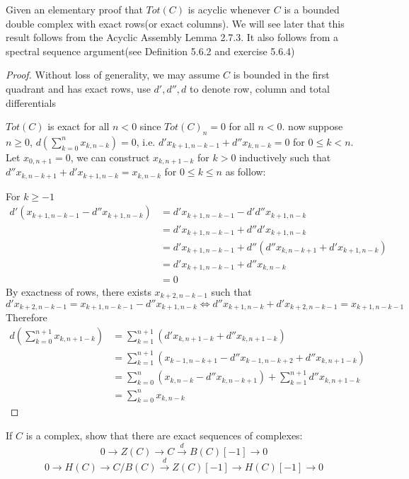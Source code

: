 \documentclass{article}
\newenvironment{exercise}[2][Exercise]{\begin{trivlist}
\item[\hskip \labelsep {\bfseries #1}\hskip \labelsep {\bfseries #2.}]}{\end{trivlist}}
\theoremstyle{definition}
\theoremstyle{remark}
\theoremstyle{definition}
\begin{document}
\begin{exercise}{\textbf{1.2.5}}
Given an elementary proof that $Tot(C)$ is acyclic whenever $C$ is a bounded double complex with exact rows(or exact columns). We will see later that this result follows from the Acyclic Assembly Lemma 2.7.3. It also follows from a spectral sequence argument(see Definition 5.6.2 and exercise 5.6.4)
\end{exercise}

\begin{proof}
Without loss of generality, we may assume $C$ is bounded in the first quadrant and has exact rows, use $d',d'',d$ to denote row, column and total differentials \par
$Tot(C)$ is exact for all $n<0$ since $Tot(C)_n=0$ for all $n<0$. now suppose $n\geq 0$, $\displaystyle d\left(\sum_{k=0}^n x_{k,n-k}\right)=0$, i.e. $d'x_{k+1,n-k-1}+d''x_{k,n-k}=0$ for $0\leq k<n$. Let $x_{0,n+1}=0$, we can construct $x_{k,n+1-k}$ for $k>0$ inductively such that $d''x_{k,n-k+1}+d'x_{k+1,n-k}=x_{k,n-k}$ for $0\leq k\leq n$ as follow: \par
For $k\geq -1$
\begin{align*}
d'(x_{k+1,n-k-1}-d''x_{k+1,n-k})&=d'x_{k+1,n-k-1}-d'd''x_{k+1,n-k} \\
&=d'x_{k+1,n-k-1}+d''d'x_{k+1,n-k} \\
&=d'x_{k+1,n-k-1}+d''(d''x_{k,n-k+1}+d'x_{k+1,n-k}) \\
&=d'x_{k+1,n-k-1}+d''x_{k,n-k} \\
&=0
\end{align*}
By exactness of rows, there exists $x_{k+2,n-k-1}$ such that
\[d'x_{k+2,n-k-1}=x_{k+1,n-k-1}-d''x_{k+1,n-k}\Leftrightarrow d''x_{k+1,n-k}+d'x_{k+2,n-k-1}=x_{k+1,n-k-1}\]
Therefore
\begin{align*}
d\left(\sum_{k=0}^{n+1} x_{k,n+1-k}\right)&=\sum_{k=1}^{n+1} (d'x_{k,n+1-k}+d''x_{k,n+1-k}) \\
&=\sum_{k=1}^{n+1} (x_{k-1,n-k+1}-d''x_{k-1,n-k+2}+d''x_{k,n+1-k}) \\
&=\sum_{k=0}^{n} (x_{k,n-k}-d''x_{k,n-k+1})+\sum_{k=1}^{n+1}d''x_{k,n+1-k} \\
&=\sum_{k=0}^{n} x_{k,n-k}
\end{align*}
\end{proof}

\begin{exercise}{\textbf{1.2.7}}
If $C$ is a complex, show that there are exact sequences of complexes:
\[0\to Z(C)\to C\xrightarrow{d}B(C)[-1]\to0\]
\[0\to H(C)\to C/B(C)\xrightarrow{d}Z(C)[-1]\to H(C)[-1]\to0\]
\end{exercise}
\end{document}
